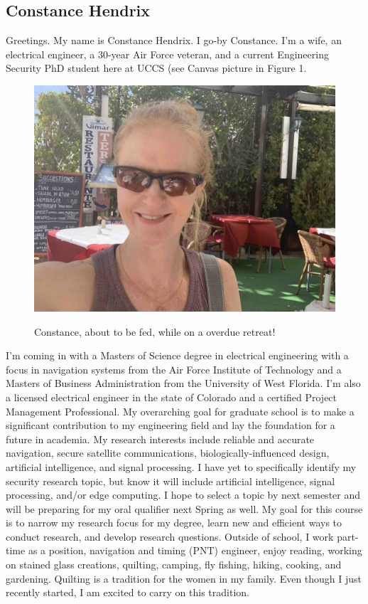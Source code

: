 
 \subsection{Constance Hendrix}
Greetings.  My name is Constance Hendrix.  I go-by Constance.  I’m a wife, an electrical engineer, a 30-year Air Force veteran, and a current Engineering Security PhD student here at UCCS (see Canvas picture in Figure 1. 
\begin{figure}[h]
    \centering
    \includegraphics[scale=0.06]{hendrix_canvas.jpg}
    \label{fig:me}
    \caption{Constance, about to be fed, while on a overdue retreat!}
\end{figure}
I’m coming in with a Masters of Science degree in electrical engineering with a focus in navigation systems from the Air Force Institute of Technology and a Masters of Business Administration from the University of West Florida.  I'm also a licensed electrical engineer in the state of Colorado and a certified Project Management Professional. My overarching goal for graduate school is to make a significant contribution to my engineering field and lay the foundation for a future in academia.  My research interests include reliable and accurate navigation, secure satellite communications, biologically-influenced design, artificial intelligence, and signal processing.  I have yet to specifically identify my security research topic, but know it will include artificial intelligence, signal processing, and/or edge computing. I hope to select a topic by next semester and will be preparing for my oral qualifier next Spring as well.  My goal for this course is to narrow my research focus for my degree, learn new and efficient ways to conduct research, and develop research questions. Outside of school, I work part-time as a position, navigation and timing (PNT) engineer, enjoy reading, working on stained glass creations, quilting, camping, fly fishing, hiking, cooking, and gardening.  Quilting is a tradition for the women in my family.  Even though I just recently started, I am excited to carry on this tradition.

